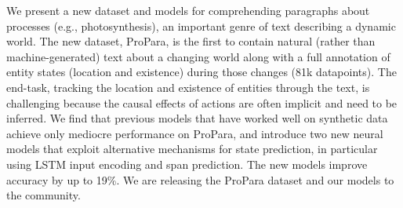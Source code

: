 We present a new dataset and models for comprehending paragraphs about processes (e.g., photosynthesis), an important genre of text describing a dynamic world. The new dataset, ProPara, is the first to contain natural (rather than machine-generated) text about a changing world along with a full annotation of entity states (location and existence) during those changes (81k datapoints). The end-task, tracking the location and existence of entities through the text, is challenging because the causal effects of actions are often implicit and need to be inferred. We find that previous models that have worked well on synthetic data achieve only mediocre performance on ProPara, and introduce two new neural models that exploit alternative mechanisms for state prediction, in particular using LSTM input encoding and span prediction. The new models improve accuracy by up to 19\%. We are releasing the ProPara dataset and our models to the community.
